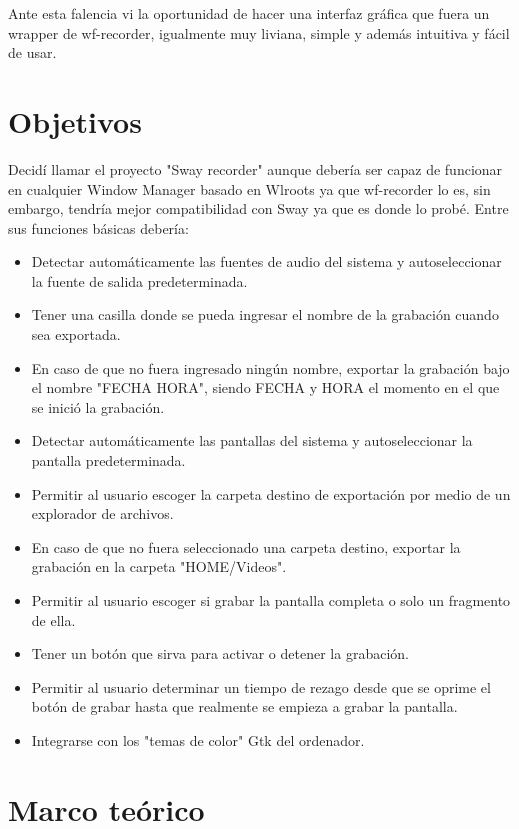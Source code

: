 \documentclass[conference]{IEEEtran}
\begin{document}
Ante esta falencia vi la oportunidad de hacer una interfaz gráfica que fuera un wrapper de wf-recorder, igualmente muy liviana, simple y además intuitiva y fácil de usar.


\section{Objetivos}

Decidí llamar el proyecto "Sway recorder" aunque debería ser capaz de funcionar en cualquier Window Manager basado en Wlroots ya que wf-recorder lo es, sin embargo, tendría mejor compatibilidad con Sway ya que es donde lo probé. Entre sus funciones básicas debería: 
\begin{itemize}
    \item Detectar automáticamente las fuentes de audio del sistema y autoseleccionar la fuente de salida predeterminada.
    \item Tener una casilla donde se pueda ingresar el nombre de la grabación cuando sea exportada.
    \item En caso de que no fuera ingresado ningún nombre, exportar la grabación bajo el nombre "FECHA HORA", siendo FECHA y HORA el momento en el que se inició la grabación.
    \item Detectar automáticamente las pantallas del sistema y autoseleccionar la pantalla predeterminada.
    \item Permitir al usuario escoger la carpeta destino de exportación por medio de un explorador de archivos.
    \item En caso de que no fuera seleccionado una carpeta destino, exportar la grabación en la carpeta "HOME/Videos".
    \item Permitir al usuario escoger si grabar la pantalla completa o solo un fragmento de ella.
    \item Tener un botón que sirva para activar o detener la grabación.
    \item Permitir al usuario determinar un tiempo de rezago desde que se oprime el botón de grabar hasta que realmente se empieza a grabar la pantalla.
    \item Integrarse con los "temas de color" Gtk del ordenador.
\end{itemize}

\section{Marco teórico}
\end{document}
